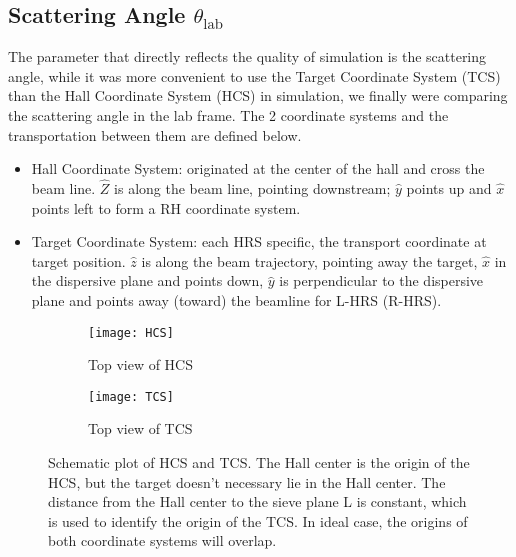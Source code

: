 \subsection{Scattering Angle $\theta_{\text{lab}}$}
The parameter that directly reflects the quality of simulation is the scattering
angle, while it was more convenient to use the Target Coordinate System (TCS) 
than the Hall Coordinate System (HCS) in simulation, we finally were comparing
the scattering angle in the lab frame. The 2 coordinate systems and the transportation
between them are defined below.

\begin{itemize}
    \item Hall Coordinate System: originated at the center of the hall and
	cross the beam line.  $\hat{Z}$ is along the beam line, pointing downstream; 
	$\hat{y}$ points up and $\hat{x}$ points left to form a RH coordinate system.
    \item Target Coordinate System: each HRS specific, the transport coordinate at target position.
	$\hat{z}$ is along the beam trajectory, pointing away the target, 
	$\hat{x}$ in the dispersive plane and points down, $\hat{y}$ is perpendicular
	to the dispersive plane and points away (toward) the beamline for L-HRS (R-HRS).
\end{itemize}

\begin{figure}[H]
    \begin{subfigure}[b]{0.5\textwidth}
	\texttt{[image: HCS]}
	\caption{Top view of HCS}
    \end{subfigure}
    \begin{subfigure}[b]{0.5\textwidth}
	\texttt{[image: TCS]}
	\caption{Top view of TCS}
    \end{subfigure}
    \caption{Schematic plot of HCS and TCS. The Hall center is the origin of the 
    HCS, but the target doesn't necessary lie in the Hall center. The distance
    from the Hall center to the sieve plane L is constant, which is used to
    identify the origin of the TCS. In ideal case, the origins of both coordinate
    systems will overlap.}
\end{figure}

